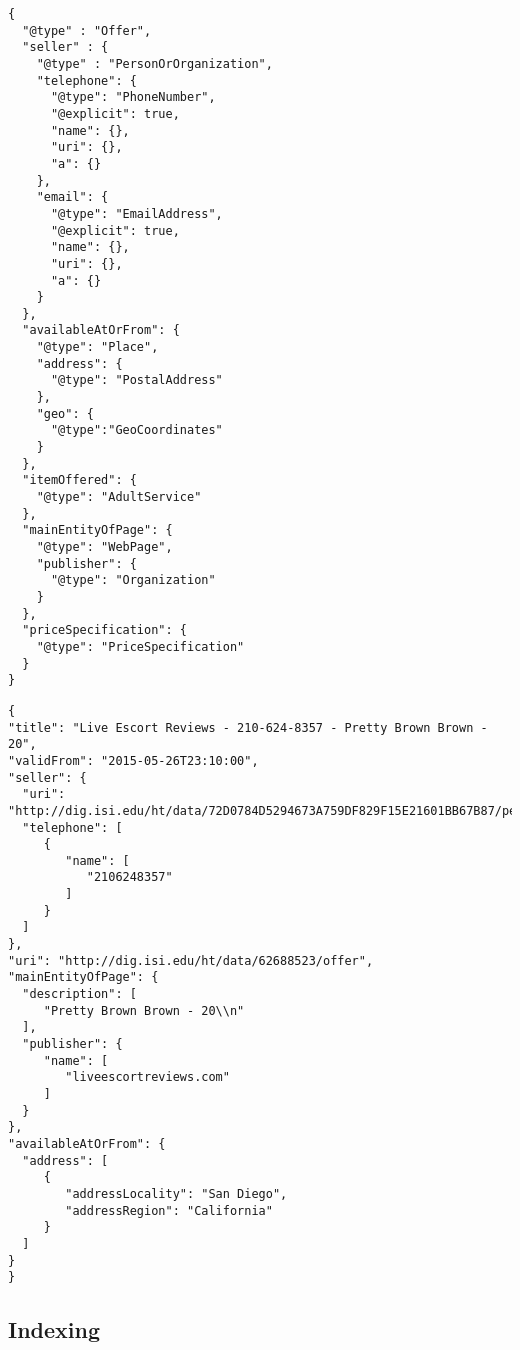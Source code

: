 \begin{verbatim}
{ 
  "@type" : "Offer",
  "seller" : {
    "@type" : "PersonOrOrganization",
    "telephone": {
      "@type": "PhoneNumber",
      "@explicit": true,
      "name": {},
      "uri": {},
      "a": {}
    },
    "email": {
      "@type": "EmailAddress",
      "@explicit": true,
      "name": {},
      "uri": {},
      "a": {}
    }
  },
  "availableAtOrFrom": {
    "@type": "Place",
    "address": {
      "@type": "PostalAddress"
    },
    "geo": {
      "@type":"GeoCoordinates"
    }
  },
  "itemOffered": {
    "@type": "AdultService"
  },
  "mainEntityOfPage": {
    "@type": "WebPage",
    "publisher": {
      "@type": "Organization"
    }
  },
  "priceSpecification": {
    "@type": "PriceSpecification"
  }
}

\end{verbatim}

\begin{verbatim}
{
"title": "Live Escort Reviews - 210-624-8357 - Pretty Brown Brown - 20",
"validFrom": "2015-05-26T23:10:00",
"seller": {
  "uri": "http://dig.isi.edu/ht/data/72D0784D5294673A759DF829F15E21601BB67B87/personororganization",
  "telephone": [
     {
        "name": [
           "2106248357"
        ]
     }
  ]
},
"uri": "http://dig.isi.edu/ht/data/62688523/offer",
"mainEntityOfPage": {
  "description": [
     "Pretty Brown Brown - 20\\n"
  ],
  "publisher": {
     "name": [
        "liveescortreviews.com"
     ]
  }
},
"availableAtOrFrom": {
  "address": [
     {
        "addressLocality": "San Diego",
        "addressRegion": "California"
     }
  ]
}
}
\end{verbatim}

\subsection{Indexing}

